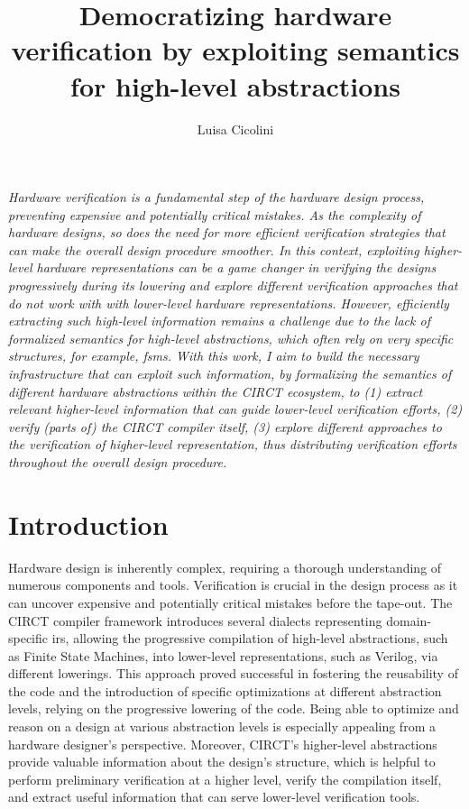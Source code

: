\documentclass[acmtog]{acmart}
\begin{document}
\title{Democratizing hardware verification by exploiting semantics for high-level abstractions}

\author{Luisa Cicolini}

\maketitle
\thispagestyle{empty}

\textit{
    Hardware verification is a fundamental step of the hardware design process, preventing expensive and potentially critical 
    mistakes.
    As the complexity of hardware designs, so does the need for more efficient verification strategies that can 
    make the overall design procedure smoother.
    In this context, exploiting higher-level hardware representations can be a game changer in verifying the designs 
    progressively during its lowering and explore different verification approaches that do not work with 
    with lower-level hardware representations. 
    However, efficiently extracting such high-level information remains a challenge due to the lack of formalized semantics  
    for high-level abstractions, which often rely on very specific structures, for example, \acp{fsm}.
    With this work, I aim to build the necessary infrastructure that can exploit such information,
    by formalizing the semantics of different hardware abstractions within the CIRCT ecosystem, to 
    (1) extract relevant higher-level information that can guide lower-level verification efforts, 
    (2) verify (parts of) the CIRCT compiler itself, 
    (3) explore different approaches to the verification of higher-level representation, thus distributing verification 
    efforts throughout the overall design procedure. 
}


\section{Introduction}

Hardware design is inherently complex, requiring a thorough understanding of numerous components and tools. 
Verification is crucial in the design process as it can uncover expensive and potentially critical mistakes before the tape-out. 
The CIRCT\cite{circt, mlir_circt} compiler framework introduces several dialects representing domain-specific \acp{ir}, 
allowing the progressive compilation of high-level abstractions, such as Finite State Machines, into lower-level representations, 
such as Verilog, via different lowerings. 
This approach proved successful in fostering the reusability of the code and the introduction of specific optimizations at different abstraction levels, 
relying on the progressive lowering of the code. 
Being able to optimize and reason on a design at various abstraction levels is especially appealing from a hardware 
designer's perspective. 
Moreover, CIRCT's higher-level abstractions provide valuable information about the design's structure, which is helpful to perform preliminary verification at a higher level, verify the compilation itself, and extract useful information that can serve lower-level verification tools\cite{huang2018instruction, chen2021leveraging, mattarei2018cosa}. 
\end{document}
